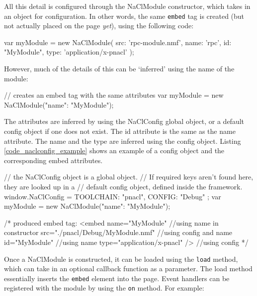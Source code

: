 All this detail is configured through the NaClModule constructor, which takes in an object for configuration. In other words, the same \lstinline{embed} tag is created (but not actually placed on the page \emph{yet}), using the following code:

\begin{code}
var myModule = new NaClModule({
  src: 'rpc-module.nmf', 
  name: 'rpc', 
  id: "MyModule", 
  type: 'application/x-pnacl'
});
\end{code}

However, much of the details of this can be `inferred' using the name of the module:

\begin{code}
// creates an embed tag with the same attributes
var myModule = new NaClModule({"name": "MyModule"});
\end{code}

The attributes are inferred by using the NaClConfig global object, or a default config object if one does not exist. The id attribute is the same as the name attribute. The name and the type are inferred using the config object. Listing \ref{code_naclconfig_example} shows an example of a config object and the corresponding embed attributes.

\begin{code}
// the NaClConfig object is a global object. 
// If required keys aren't found here, they are looked up in a 
// default config object, defined inside the framework.
window.NaClConfig = {
  TOOLCHAIN: "pnacl",
  CONFIG: "Debug"
};
var myModule = new NaClModule({"name": "MyModule"});

/* produced embed tag:
<embed name="MyModule"                   //using name in constructor
       src="./pnacl/Debug/MyModule.nmf"  //using config and name
       id="MyModule"                     //using name
       type="application/x-pnacl" />     //using config
*/
\end{code}

Once a NaClModule is constructed, it can be loaded using the \lstinline{load} method, which can take in an optional callback function as a parameter. The load method essentially inserts the \lstinline{embed} element into the page. Event handlers can be registered with the module by using the \lstinline{on} method. For example:

